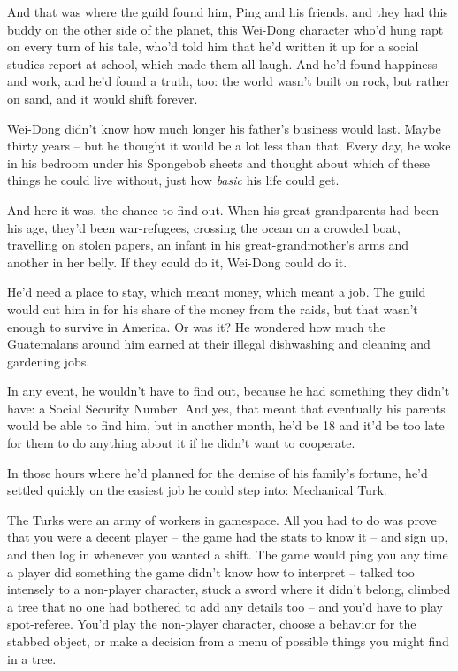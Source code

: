 And that was where the guild found him, Ping and his friends, and
they had this buddy on the other side of the planet, this Wei-Dong
character who'd hung rapt on every turn of his tale, who'd told him
that he'd written it up for a social studies report at school,
which made them all laugh. And he'd found happiness and work, and
he'd found a truth, too: the world wasn't built on rock, but rather
on sand, and it would shift forever.

Wei-Dong didn't know how much longer his father's business would
last. Maybe thirty years -- but he thought it would be a lot less
than that. Every day, he woke in his bedroom under his Spongebob
sheets and thought about which of these things he could live
without, just how \emph{basic} his life could get.

And here it was, the chance to find out. When his
great-grandparents had been his age, they'd been war-refugees,
crossing the ocean on a crowded boat, travelling on stolen papers,
an infant in his great-grandmother's arms and another in her belly.
If they could do it, Wei-Dong could do it.

He'd need a place to stay, which meant money, which meant a job.
The guild would cut him in for his share of the money from the
raids, but that wasn't enough to survive in America. Or was it? He
wondered how much the Guatemalans around him earned at their
illegal dishwashing and cleaning and gardening jobs.

In any event, he wouldn't have to find out, because he had
something they didn't have: a Social Security Number. And yes, that
meant that eventually his parents would be able to find him, but in
another month, he'd be 18 and it'd be too late for them to do
anything about it if he didn't want to cooperate.

In those hours where he'd planned for the demise of his family's
fortune, he'd settled quickly on the easiest job he could step
into: Mechanical Turk.

The Turks were an army of workers in gamespace. All you had to do
was prove that you were a decent player -- the game had the stats
to know it -- and sign up, and then log in whenever you wanted a
shift. The game would ping you any time a player did something the
game didn't know how to interpret -- talked too intensely to a
non-player character, stuck a sword where it didn't belong, climbed
a tree that no one had bothered to add any details too -- and you'd
have to play spot-referee. You'd play the non-player character,
choose a behavior for the stabbed object, or make a decision from a
menu of possible things you might find in a tree.

